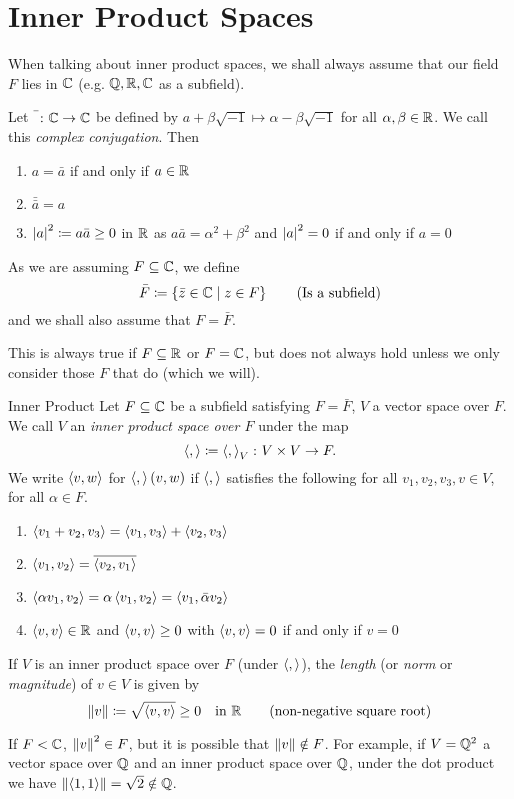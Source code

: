 \documentclass[class=article, crop=false]{standalone}
\begin{document}
  \section{Inner Product Spaces}
  When talking about inner product spaces, we shall always assume that our field $F$ lies in $\mathbb{C}$ (e.g. $\mathbb{Q}, \mathbb{R}, \mathbb{C}$ as a subfield). \par
  Let $\bar{\phantom i}\colon \C\to\C$ be defined by $a + \beta\sqrt{-1}\mapsto \alpha-\beta\sqrt{-1}$ for all $\alpha,\beta\in \mathbb{R}$. We call this \emph{complex conjugation}. Then
  \begin{enumerate}[label=(\alph*)]
    \item $a = \bar{a}$ if and only if $a\in \mathbb{R}$
    \item $\bar{\bar{a}} = a$
    \item $\left\lvert a \right\rvert^2\coloneqq a\bar{a}\geq 0$ in $\mathbb{R}$ as $a\bar{a}=\alpha^2+\beta^2$ and $\left\lvert a \right\rvert^2 = 0$ if and only if $a=0$
  \end{enumerate} 
  As we are assuming $F\subseteq \mathbb{C}$, we define
  \[
    \bar{F} \coloneqq \left\{\bar{z}\in\mathbb{C}\mid z\in F\right\} \tag{Is a subfield}
  \]
  and we shall also assume that $F = \bar{F}$.
  \begin{note}{}
    This is always true if $F\subseteq \mathbb{R}$ or $F = \mathbb{C}$, but does not always hold unless we only consider those $F$ that do (which we will).
  \end{note}
  \begin{definition}{Inner Product}
    Let $F\subseteq \mathbb{C}$ be a subfield satisfying $F = \bar{F}$, $V$ a vector space over $F$. We call $V$ an \emph{inner product space over $F$} under the map
    \[
      \left\langle , \right\rangle\coloneqq \left\langle , \right\rangle_V\colon V\times V\to F.
    \]
    We write $\left\langle v,w \right\rangle$ for $\left\langle , \right\rangle(v, w)$ if $\left\langle , \right\rangle$ satisfies the following for all $v_1,v_2,v_3,v\in V$, for all $\alpha\in F$.
    \begin{enumerate}[label=(\alph*)]
      \item $\left\langle v_1+v_2,v_3 \right\rangle = \left\langle v_1,v_3 \right\rangle + \left\langle v_2,v_3 \right\rangle$
      \item $\left\langle v_1,v_2 \right\rangle=\overline{\left\langle v_2,v_1 \right\rangle}$
      \item $\left\langle \alpha v_1,v_2 \right\rangle = \alpha \left\langle v_1,v_2 \right\rangle = \left\langle v_1,\bar{\alpha}v_2 \right\rangle$
      \item $\left\langle v,v \right\rangle\in \mathbb{R}$ and $\left\langle v,v \right\rangle\geq 0$ with $\left\langle v,v \right\rangle = 0$ if and only if $v = 0$
    \end{enumerate}
    If $V$ is an inner product space over $F$ (under $\left\langle , \right\rangle$), the \emph{length} (or \emph{norm} or \emph{magnitude}) of $v\in V$ is given by 
    \[
      \left\lVert v\right\rVert\coloneqq \sqrt{\left\langle v,v \right\rangle}\geq 0 \quad \text{in }\mathbb{R} \tag{non-negative square root}
    \]
  \end{definition}
  \begin{note}{}
    If $F < \mathbb{C}$, $\left\lVert v\right\rVert^2\in F$, but it is possible that $\left\lVert v\right\rVert\notin F$. For example, if $V = \mathbb{Q}^2$ a vector space over $\mathbb{Q}$ and an inner product space over $\mathbb{Q}$, under the dot product we have $\left\lVert \left\langle 1,1 \right\rangle\right\rVert = \sqrt{2}\notin \mathbb{Q}$.
  \end{note}
\end{document}
